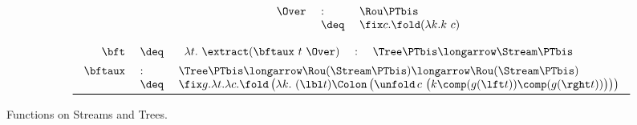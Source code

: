 \begin{table}[t!]
\[\begin{array}{c}
\begin{array}{c !{\qquad} c}
&

\begin{array}[t]{l !{~}l!{~} l}
  \bm{\Over}
& :
& \Rou \PTbis
\\
& \deq
& \fix c. \fold(\lambda k. k\ c)
\end{array}

\end{array}

\\\\

\begin{array}{r !{~}l!{~} l}
  \bm{\bft}
& \deq
& \begin{array}{l !{~}c!{~} l}
    \lambda t.~ \extract (\bftaux\ t\ \Over)
  & :
  & \Tree \PTbis
    \longarrow
    \Stream \PTbis
  \end{array}
\\[0.5em]

  \bm{\bftaux}
& :
& \Tree\PTbis
  \longarrow
  \Rou (\Stream\PTbis)
  \longarrow
  \Rou (\Stream\PTbis)
\\

& \deq
& \fix g.\lambda t.\lambda c.
  \fold \left(
    \lambda k.~
    (\lbl t) \Colon
    \left( \unfold\, c \ \big( k \comp (g (\lft t)) \comp (g (\rght t)) \big) \right)
  \right)

\end{array}

\\\bottomrule

\end{array}
\]
\caption{Functions on Streams and Trees.\label{tab:ex}}
\end{table}






